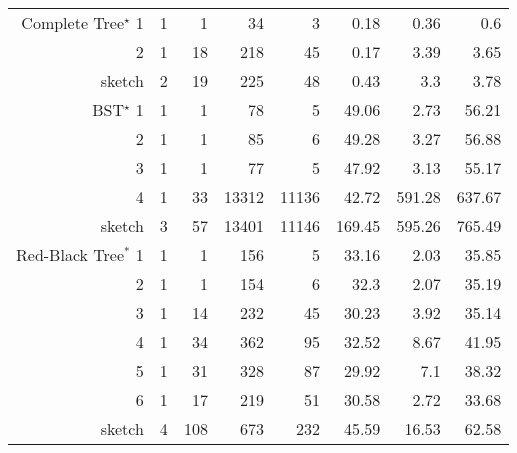 \begin{tabular}{r|rr|rrrrr}
\midrule
  Complete Tree$^\star$ 1 &        1 &             1 &         34 &        3 &            0.18 &            0.36 &            0.6  \\
                        2 &        1 &            18 &        218 &       45 &            0.17 &            3.39 &            3.65 \\
                   sketch &        2 &            19 &        225 &       48 &            0.43 &            3.3  &            3.78 \\
\midrule
            BST$^\star$ 1 &        1 &             1 &         78 &        5 &           49.06 &            2.73 &           56.21 \\
                        2 &        1 &             1 &         85 &        6 &           49.28 &            3.27 &           56.88 \\
                        3 &        1 &             1 &         77 &        5 &           47.92 &            3.13 &           55.17 \\
                        4 &        1 &            33 &      13312 &    11136 &           42.72 &          591.28 &          637.67 \\
                   sketch &        3 &            57 &      13401 &    11146 &          169.45 &          595.26 &          765.49 \\
  \hhline{=|==|=====}
     Red-Black Tree$^*$ 1 &        1 &             1 &        156 &        5 &           33.16 &            2.03 &           35.85 \\
                        2 &        1 &             1 &        154 &        6 &           32.3  &            2.07 &           35.19 \\
                        3 &        1 &            14 &        232 &       45 &           30.23 &            3.92 &           35.14 \\
                        4 &        1 &            34 &        362 &       95 &           32.52 &            8.67 &           41.95 \\
                        5 &        1 &            31 &        328 &       87 &           29.92 &            7.1  &           38.32 \\
                        6 &        1 &            17 &        219 &       51 &           30.58 &            2.72 &           33.68 \\
                   sketch &        4 &           108 &        673 &      232 &           45.59 &           16.53 &           62.58 \\
\hline
\end{tabular}

